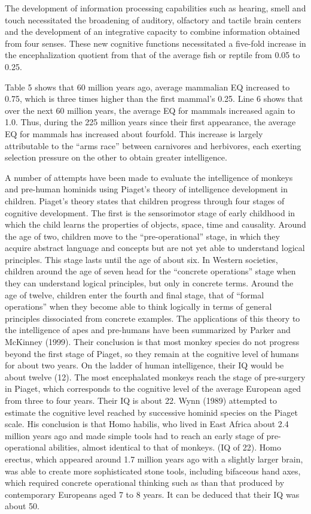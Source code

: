 The development of information processing capabilities such as hearing, smell and touch
necessitated the broadening of auditory, olfactory and tactile brain centers and the development 
of an integrative capacity to combine information obtained from four senses.
These new cognitive functions necessitated a five-fold increase in the encephalization quotient
from that of the average fish or reptile from 0.05 to 0.25.

Table 5 shows that 60 million years ago, average mammalian EQ increased to 0.75, which is three 
times higher than the first mammal’s 0.25. Line 6 shows that over the next 60 million years,
the average EQ for mammals increased again to 1.0.
Thus, during the 225 million years since their first appearance, the average EQ for mammals has 
increased about fourfold.
This increase is largely attributable to the ``arms race'' between carnivores and herbivores,
each exerting selection pressure on the other to obtain greater intelligence.

A number of attempts have been made to evaluate the intelligence of monkeys and pre-human hominids
using Piaget’s theory of intelligence development in children. 
Piaget’s theory states that children progress through four stages of cognitive development.
The first is the sensorimotor stage of early childhood in which the child learns the properties of
objects, space, time and causality. 
Around the age of two, children move to the ``pre-operational'' stage, in which they acquire
abstract language and concepts but are not yet able to understand logical principles. 
This stage lasts until the age of about six. In Western societies, children around the age of
seven head for the ``concrete operations'' stage when they can understand logical principles,
but only in concrete terms.
Around the age of twelve, children enter the fourth and final stage, that of 
``formal operations'' when they become able to think logically in terms of general principles
dissociated from concrete examples.
The applications of this theory to the intelligence of apes and pre-humans have been summarized by
Parker and McKinney (1999).
Their conclusion is that most monkey species do not progress beyond the first stage of Piaget,
so they remain at the cognitive level of humans for about two years.
On the ladder of human intelligence, their IQ would be about twelve (12).
The most encephalated monkeys reach the stage of pre-surgery in Piaget, which corresponds to
the cognitive level of the average European aged from three to four years.
Their IQ is about 22. Wynn (1989) attempted to estimate the cognitive level reached by successive
hominid species on the Piaget scale.
His conclusion is that Homo habilis, who lived in East Africa about 2.4 million years ago and
made simple tools had to reach an early stage of pre-operational abilities, almost identical to
that of monkeys. (IQ of 22). Homo erectus, which appeared around 1.7 million years ago with a
slightly larger brain, was able to create more sophisticated stone tools, including bifaceous hand
axes, which required concrete operational thinking such as than that produced by contemporary
Europeans aged 7 to 8 years. It can be deduced that their IQ was about 50.




